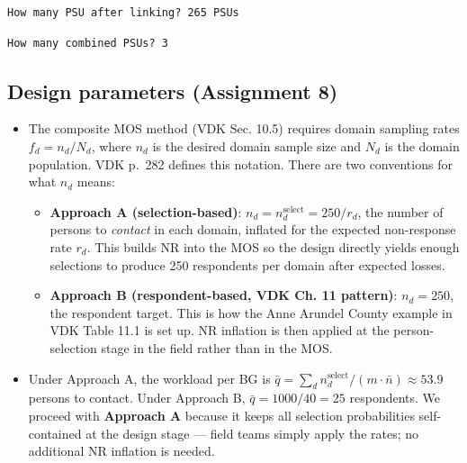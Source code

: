 \documentclass[
  11pt,
]{article}
\newenvironment{Shaded}{\begin{snugshade}}{\end{snugshade}}
\newcommand{\DecValTok}[1]{\textcolor[rgb]{0.68,0.00,0.00}{#1}}
\newcommand{\FunctionTok}[1]{\textcolor[rgb]{0.28,0.35,0.67}{#1}}
\newcommand{\NormalTok}[1]{\textcolor[rgb]{0.00,0.23,0.31}{#1}}
\newcommand{\SpecialCharTok}[1]{\textcolor[rgb]{0.37,0.37,0.37}{#1}}
\newcommand{\StringTok}[1]{\textcolor[rgb]{0.13,0.47,0.30}{#1}}
\begin{document}
\begin{verbatim}
How many PSU after linking? 265 PSUs
\end{verbatim}

\begin{Shaded}
\end{Shaded}

\begin{verbatim}
How many combined PSUs? 3 
\end{verbatim}

\newpage

\subsection{Design parameters (Assignment 8)}\label{sec-params}

\begin{itemize}
\item
  The composite MOS method (VDK Sec. 10.5) requires domain sampling
  rates \(f_d = n_d / N_d\), where \(n_d\) is the desired domain sample
  size and \(N_d\) is the domain population. VDK p.~282 defines this
  notation. There are two conventions for what \(n_d\) means:

  \begin{itemize}
  \item
    \textbf{Approach A (selection-based)}:
    \(n_d = n_d^{\text{select}} = 250 / r_d\), the number of persons to
    \emph{contact} in each domain, inflated for the expected
    non-response rate \(r_d\). This builds NR into the MOS so the design
    directly yields enough selections to produce 250 respondents per
    domain after expected losses.
  \item
    \textbf{Approach B (respondent-based, VDK Ch. 11 pattern)}:
    \(n_d = 250\), the respondent target. This is how the Anne Arundel
    County example in VDK Table 11.1 is set up. NR inflation is then
    applied at the person-selection stage in the field rather than in
    the MOS.
  \end{itemize}
\item
  Under Approach A, the workload per BG is
  \(\bar{q} = \sum_d n_d^{\text{select}} / (m \cdot \bar{n}) \approx 53.9\)
  persons to contact. Under Approach B, \(\bar{q} = 1000 / 40 = 25\)
  respondents. We proceed with \textbf{Approach A} because it keeps all
  selection probabilities self-contained at the design stage --- field
  teams simply apply the rates; no additional NR inflation is needed.
\end{itemize}
\end{document}
